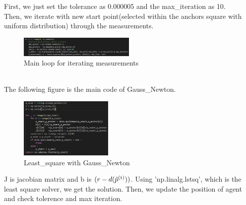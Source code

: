 \documentclass[a4paper]{article}
\begin{document}
First, we just set the tolerance as 0.000005 and the max\_iteration as 10.\\
Then, we iterate with new start point(selected within the anchors square with uniform distribution) through the measurements.
\begin{figure}[h]
	\begin{center}
		\includegraphics[width=0.5\textwidth]{gauss_newton.jpg}
		\caption{Main loop for iterating measurements}
	\end{center}
\end{figure}\\
The following figure is the main code of Gauss\_Newton.\\
\begin{figure}[h]
	\begin{center}
		\includegraphics[width=0.4\textwidth]{least_square.jpg}
		\caption{Least\_square with Gauss\_Newton}
	\end{center}
\end{figure}

J is jacobian matrix and b is $(r-d(\hat{p}\textsuperscript{(t)}))$.
Using 'np.linalg.lstsq', which is the least square solver, we get the solution. Then, we update the position of agent and check tolerence and max iteration.

\clearpage
\end{document}
